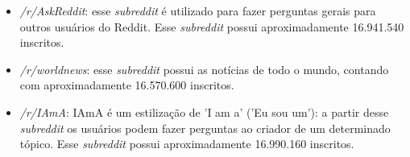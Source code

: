\begin{itemize}
  \item \textit{/r/AskReddit}: esse \textit{subreddit} é utilizado para fazer
  perguntas gerais para outros usuários do Reddit. Esse \textit{subreddit}
  possui aproximadamente 16.941.540 inscritos.
  \item \textit{/r/worldnews}: esse \textit{subreddit} possui as notícias de
  todo o mundo, contando com aproximadamente 16.570.600 inscritos.
  \item \textit{/r/IAmA}: IAmA é um estilização de 'I am a' ('Eu sou um'):
  a partir desse \textit{subreddit} os usuários podem fazer perguntas ao criador
  de um determinado tópico. Esse \textit{subreddit} possui aproximadamente
  16.990.160 inscritos.
\end{itemize}

% 


